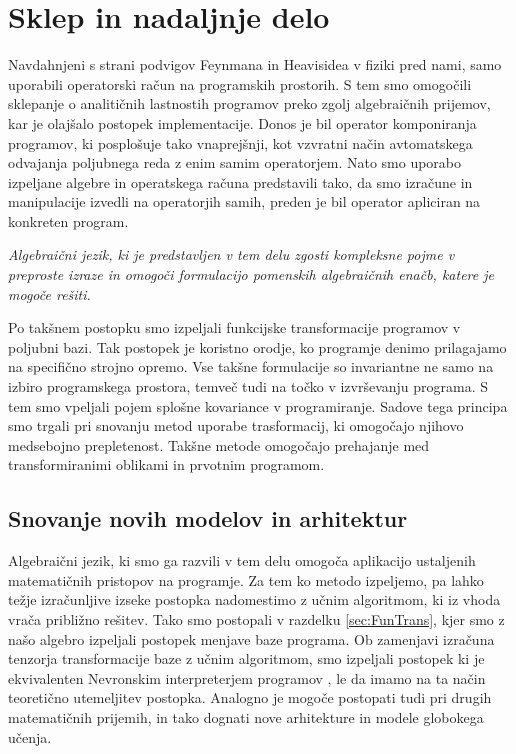 \documentclass[a4paper, 12pt]{book}
\begin{document}
\chapter{Sklep in nadaljnje delo} \label{ch:zakSklp}

Navdahnjeni s strani podvigov Feynmana \cite{Feynman} in Heavisidea \cite{HeavisideOperational} v fiziki pred nami, samo uporabili operatorski račun na programskih prostorih. S tem smo omogočili sklepanje o analitičnih lastnostih programov preko zgolj algebraičnih prijemov, kar je olajšalo postopek implementacije. Donos je bil operator komponiranja programov, ki posplošuje tako vnaprejšnji, kot vzvratni način avtomatskega odvajanja poljubnega reda z enim samim operatorjem. Nato smo uporabo izpeljane algebre in operatskega računa predstavili tako, da smo izračune in manipulacije izvedli na operatorjih samih, preden je bil operator apliciran na konkreten program. 

\emph{Algebraični jezik, ki je predstavljen v tem delu zgosti kompleksne pojme v preproste izraze in omogoči formulacijo pomenskih algebraičnih enačb, katere je mogoče rešiti.} 

Po takšnem postopku smo izpeljali funkcijske transformacije programov v poljubni bazi. Tak postopek je koristno orodje, ko programje denimo prilagajamo na specifično strojno opremo. Vse takšne formulacije so invariantne ne samo na izbiro programskega prostora, temveč tudi na točko v izvrševanju programa. S tem smo vpeljali pojem splošne kovariance v programiranje. Sadove tega principa smo trgali pri snovanju metod uporabe trasformacij, ki omogočajo njihovo medsebojno prepletenost. Takšne metode omogočajo prehajanje med transformiranimi oblikami in prvotnim programom.

\section{Snovanje novih modelov in arhitektur}

Algebraični jezik, ki smo ga razvili v tem delu omogoča aplikacijo ustaljenih matematičnih pristopov na programje. Za tem ko metodo izpeljemo, pa lahko težje izračunljive izseke postopka nadomestimo z učnim algoritmom, ki iz vhoda vrača približno rešitev. Tako smo postopali v razdelku \ref{sec:FunTrans}, kjer smo z našo algebro izpeljali postopek menjave baze programa. Ob zamenjavi izračuna tenzorja transformacije baze z učnim algoritmom, smo izpeljali postopek ki je ekvivalenten Nevronskim interpreterjem programov \cite{progInterp}, le da imamo na ta način teoretično utemeljitev postopka. Analogno je mogoče postopati tudi pri drugih matematičnih prijemih, in tako dognati nove arhitekture in modele globokega učenja.
\end{document}
